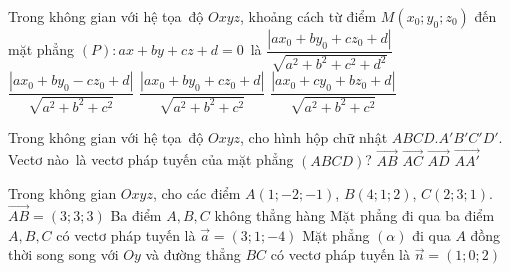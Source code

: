 \begin{ex}%
	Trong không gian với hệ tọa~độ $Oxyz$, khoảng cách  từ điểm $M\left({{x}_0};{{y}_0};{{z}_0} \right)$ đến mặt phẳng $(P)\colon ax+by+cz+d=0$~là
	\choice 
		 {$\dfrac{\left| a{{x}_0}+b{{y}_0}+c{{z}_0}+d \right|}{\sqrt{a^2+b^2+c^2+d^2}}$}
		{$\dfrac{\left|  a{{x}_0}+b{{y}_0}-c{{z}_0}+d \right|}{\sqrt{a^2+b^2+c^2}}$}
		{\True $\dfrac{\left| a{{x}_0}+b{{y}_0}+c{{z}_0}+d \right|}{\sqrt{a^2+b^2+c^2}}$} 
		 {$\dfrac{\left| a{{x}_0}+c{{y}_0}+b{{z}_0}+d \right|}{\sqrt{a^2+b^2+c^2}}$}
\end{ex}

\begin{ex}%
	Trong không gian với hệ tọa~độ $Oxyz$, cho hình hộp chữ nhật  $ABCD.A'B'C'D'$. Vectơ nào~là vectơ pháp tuyến của mặt phẳng $\left(ABCD \right)$?
	 \choice
		{$\overrightarrow{AB}$} 
		{$\overrightarrow{AC}$} 
		{$\overrightarrow{AD}$} 
		{\True  $\overrightarrow{AA'}$}
\end{ex}



\begin{ex}%
	Trong  không gian $Oxyz$, cho các điểm $A(1; -2; -1)$, $B(4; 1; 2)$, $C(2; 3; 1)$.
	 \choiceTF
		{\True $\overrightarrow{AB}  = (3; 3; 3)$}
		{\True Ba điểm  $A, B, C$ không thẳng hàng}
		{\True Mặt phẳng đi qua ba điểm $A,  B, C$ có vectơ pháp tuyến là $\overrightarrow{a} = (3; 1; -4)$}
		{Mặt phẳng $(\alpha)$  đi qua $A$ đồng thời song song với $Oy$ và đường thẳng $BC$ có vectơ pháp tuyến là $\overrightarrow{n} = (1; 0; 2)$}
\end{ex}

